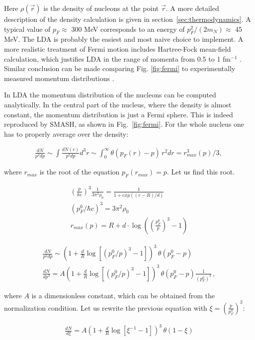 Here $\rho(\vec{r})$ is the density of nucleons at the point $\vec{r}$.
A more detailed description of the density calculation is given in
section~\ref{sec:thermodynamics}. A typical value of $p_F \approx$ 300 MeV
corresponds to an energy of $p_F^2/(2m_N) \approx$ 45 MeV. The LDA
is probably the easiest and most naive choice to implement. A more realistic
treatment of Fermi motion includes Hartree-Fock mean-field calculation,
which justifies LDA in the range of momenta from 0.5 to 1 fm$^{-1}$ \cite{Jaminon:1986ktn}.
Similar conclusion can be made comparing Fig. \ref{fig:fermi} to experimentally
measured momentum distributions \cite{Gaidarov:1995pm}.

In LDA the momentum distribution of the nucleons can be computed analytically. In
the central part of the nucleus, where the density is almost constant, the momentum
distribution is just a Fermi sphere. This is indeed reproduced by SMASH, as shown in Fig.~\ref{fig:fermi}.
For the whole nucleus one has to properly average over the density:

\begin{align}
  \frac{dN}{p^2 dp} \sim \int \frac{dN(r)}{p^2 dp} d^3r \sim \int_0^{\infty} \theta(p_F(r)-p) \, r^2 dr = r^3_{max}(p)/3,\,
\end{align}

where $r_{max}$ is the root of the equation $p_F(r_{max})=p$. Let us find this root.

\begin{align}
  \left( \frac{p}{\hbar c}\right)^3 \frac{1}{3 \pi^2 \rho_0} = \frac{1}{1 + exp((r-R)/d)} \\
  (p_F^0/\hbar c)^3 = 3 \pi^2 \rho_0 \\
  r_{max}(p) = R + d \cdot \log \left(\left( \frac{p_F^0}{p} \right)^3 - 1 \right)
\end{align}

\begin{align}
  \frac{dN}{p^2 dp} \sim \left(1 +\frac{d}{R} \log[(p_F^0/p)^3 - 1] \right)^3 \, \theta(p_F^0 - p) \\
  \frac{dN}{dp^3} = A \left(1 +\frac{d}{R} \log[(p_F^0/p)^3 - 1] \right)^3 \, \theta(p_F^0 - p) \frac{1}{(p_F^0)^3} \,,
\end{align}

where $A$ is a dimensionless constant, which can be obtained from the normalization condition.
Let us rewrite the previous equation with $\xi = \left( \frac{p}{p_F^0} \right)^3$:

\begin{align}
  \frac{dN}{d\xi} = A \left(1 +\frac{d}{R} \log[\xi^{-1} - 1] \right)^3 \, \theta(1 - \xi)
\end{align}

